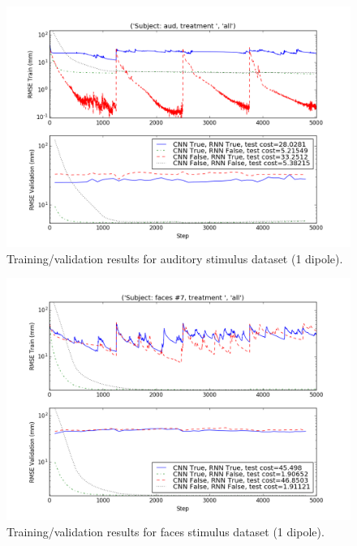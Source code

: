 \documentclass[journal,12pt,onecolumn,draftclsnofoot]{IEEEtran}
\begin{document}
\begin{figure}[h!]
\centering
\includegraphics[width=5in]{finalplots/aud1}
\caption{Training/validation results for auditory stimulus dataset (1 dipole).}
\label{fig:aud}
\end{figure}


\begin{figure}[h!]
\centering
\includegraphics[width=5in]{finalplots/faces1}
\caption{Training/validation results for faces stimulus dataset (1 dipole).}
\label{fig:faces}
\end{figure}
\end{document}
